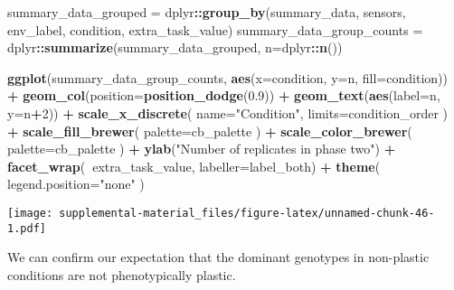 \documentclass[]{book}
\newenvironment{Shaded}{\begin{snugshade}}{\end{snugshade}}
\newcommand{\DataTypeTok}[1]{\textcolor[rgb]{0.13,0.29,0.53}{#1}}
\newcommand{\DecValTok}[1]{\textcolor[rgb]{0.00,0.00,0.81}{#1}}
\newcommand{\FloatTok}[1]{\textcolor[rgb]{0.00,0.00,0.81}{#1}}
\newcommand{\KeywordTok}[1]{\textcolor[rgb]{0.13,0.29,0.53}{\textbf{#1}}}
\newcommand{\NormalTok}[1]{#1}
\newcommand{\OperatorTok}[1]{\textcolor[rgb]{0.81,0.36,0.00}{\textbf{#1}}}
\newcommand{\StringTok}[1]{\textcolor[rgb]{0.31,0.60,0.02}{#1}}
\begin{document}
\begin{Shaded}
\begin{Highlighting}[]
\NormalTok{summary_data_grouped =}\StringTok{ }\NormalTok{dplyr}\OperatorTok{::}\KeywordTok{group_by}\NormalTok{(summary_data, sensors, env_label, condition, extra_task_value)}
\NormalTok{summary_data_group_counts =}\StringTok{ }\NormalTok{dplyr}\OperatorTok{::}\KeywordTok{summarize}\NormalTok{(summary_data_grouped, }\DataTypeTok{n=}\NormalTok{dplyr}\OperatorTok{::}\KeywordTok{n}\NormalTok{())}

\KeywordTok{ggplot}\NormalTok{(summary_data_group_counts, }\KeywordTok{aes}\NormalTok{(}\DataTypeTok{x=}\NormalTok{condition, }\DataTypeTok{y=}\NormalTok{n, }\DataTypeTok{fill=}\NormalTok{condition)) }\OperatorTok{+}
\StringTok{  }\KeywordTok{geom_col}\NormalTok{(}\DataTypeTok{position=}\KeywordTok{position_dodge}\NormalTok{(}\FloatTok{0.9}\NormalTok{)) }\OperatorTok{+}
\StringTok{  }\KeywordTok{geom_text}\NormalTok{(}\KeywordTok{aes}\NormalTok{(}\DataTypeTok{label=}\NormalTok{n, }\DataTypeTok{y=}\NormalTok{n}\OperatorTok{+}\DecValTok{2}\NormalTok{)) }\OperatorTok{+}
\StringTok{  }\KeywordTok{scale_x_discrete}\NormalTok{(}
    \DataTypeTok{name=}\StringTok{"Condition"}\NormalTok{,}
    \DataTypeTok{limits=}\NormalTok{condition_order}
\NormalTok{  ) }\OperatorTok{+}
\StringTok{  }\KeywordTok{scale_fill_brewer}\NormalTok{(}
    \DataTypeTok{palette=}\NormalTok{cb_palette}
\NormalTok{  ) }\OperatorTok{+}
\StringTok{  }\KeywordTok{scale_color_brewer}\NormalTok{(}
    \DataTypeTok{palette=}\NormalTok{cb_palette}
\NormalTok{  ) }\OperatorTok{+}
\StringTok{  }\KeywordTok{ylab}\NormalTok{(}\StringTok{"Number of replicates in phase two"}\NormalTok{) }\OperatorTok{+}
\StringTok{  }\KeywordTok{facet_wrap}\NormalTok{(}\OperatorTok{~}\NormalTok{extra_task_value, }\DataTypeTok{labeller=}\NormalTok{label_both) }\OperatorTok{+}
\StringTok{  }\KeywordTok{theme}\NormalTok{(}
    \DataTypeTok{legend.position=}\StringTok{"none"}
\NormalTok{  )}
\end{Highlighting}
\end{Shaded}

\texttt{[image: supplemental-material\_files/figure-latex/unnamed-chunk-46-1.pdf]}

We can confirm our expectation that the dominant genotypes in non-plastic conditions are not phenotypically plastic.
\end{document}
